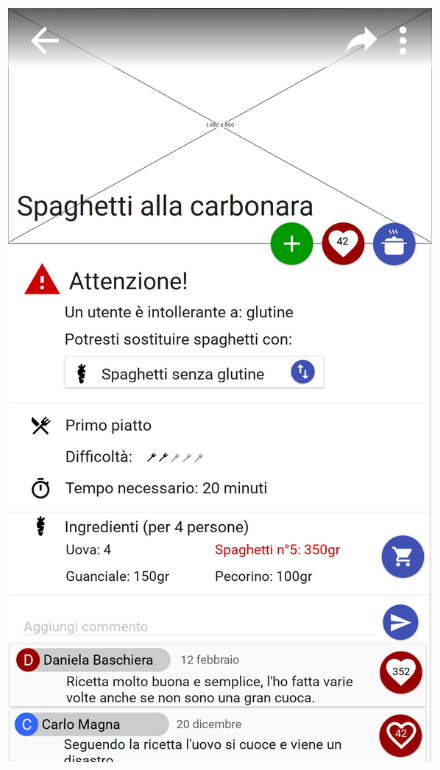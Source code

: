\begin{figure}[H]
	\begin{minipage}{.49\textwidth}
		\includegraphics[width=\textwidth]{img/wireframe/presentazione_ricetta_allergia_cambio_ingrediente_aggiungi_ricetta.png}
	\end{minipage}
	\begin{minipage}{.49\textwidth}

\end{minipage}
\end{figure}

